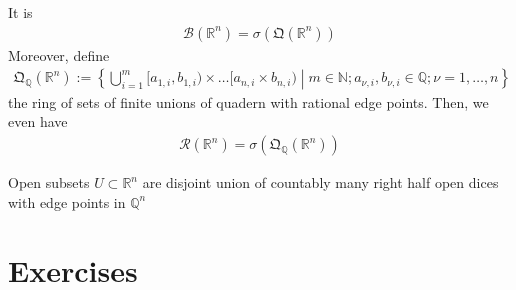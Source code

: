 \begin{theorem}
    It is
    \begin{align}
        \mathcal{B}(\mathbb{R}^n) = \sigma(\mathfrak{Q}(\mathbb{R}^n))
    \end{align}
    Moreover, define
    \begin{align}
        \mathfrak{Q}_{\mathbb{Q}}(\mathbb{R}^n) := \left\{ \bigcup_{i=1}^m [a_{1, i}, b_{1, i}) \times \dots [a_{n, i} \times b_{n, i}) \middle| m \in \mathbb{N}; a_{\nu, i}, b_{\nu, i} \in \mathbb{Q}; \nu = 1, \dots, n \right\}
    \end{align}
    the ring of sets of finite unions of quadern with rational edge points. Then, we even have
    \begin{align}
        \mathcal{R}(\mathbb{R}^n) = \sigma( \mathfrak{Q}_{\mathbb{Q}} (\mathbb{R}^n))
    \end{align}
\end{theorem}
\begin{lemma}
    Open subsets \(U \subset \mathbb{R}^n\) are disjoint union of countably many right half open dices with edge points in \(\mathbb{Q}^n\)
\end{lemma}
%
%
%
\section{Exercises}